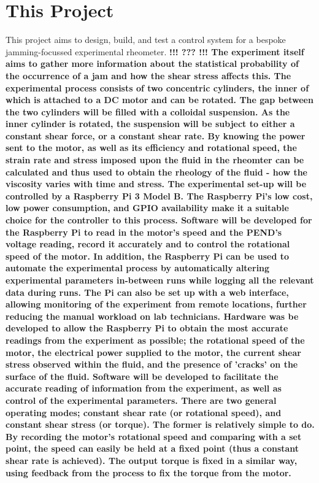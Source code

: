 \documentclass[twoside,a4]{report}
\def\br{\newline \newline \noindent}
\def\cbh{\large\bfseries !!! ??? !!! \normalsize\normalfont}
\begin{document}
	\section{This Project} %
	This project aims to design, build, and test a control system for a bespoke jamming-focussed experimental rheometer. \cbh %
	The experiment itself aims to gather more information about the statistical probability of the occurrence of a jam and how the shear stress affects this. \br
	The experimental process consists of two concentric cylinders, the inner of which is attached to a DC motor and can be rotated. The gap between the two cylinders will be filled with a colloidal suspension. As the inner cylinder is rotated, the suspension will be subject to either a constant shear force, or a constant shear rate. 
	By knowing the power sent to the motor, as well as its efficiency and rotational speed, the strain rate and stress imposed upon the fluid in the rheomter can be calculated and thus used to obtain the rheology of the fluid - how the viscosity varies with time and stress. \br
	The experimental set-up will be controlled by a Raspberry Pi 3 Model B. The Raspberry Pi's low cost, low power consumption, and GPIO availability make it a suitable choice for the controller to this process. Software will be developed for the Raspberry Pi to read in the motor's speed and the PEND's voltage reading, record it accurately and to control the rotational speed of the motor. In addition, the Raspberry Pi can be used to automate the experimental process by automatically altering experimental parameters in-between runs while logging all the relevant data during runs. The Pi can also be set up with a web interface, allowing monitoring of the experiment from remote locations, further reducing the manual workload on lab technicians. \br
	Hardware was be developed to allow the Raspberry Pi to obtain the most accurate readings from the experiment as possible; the rotational speed of the motor, the electrical power supplied to the motor, the current shear stress observed within the fluid, and the presence of 'cracks' on the surface of the fluid.\br
	Software will be developed to facilitate the accurate reading of information from the experiment, as well as control of the experimental parameters. There are two general operating modes; constant shear rate (or rotational speed), and constant shear stress (or torque). The former is relatively simple to do. By recording the motor's rotational speed and comparing with a set point, the speed can easily be held at a fixed point (thus a constant shear rate is achieved). The output torque is fixed in a similar way, using feedback from the process to fix the torque from the motor.
\end{document}
